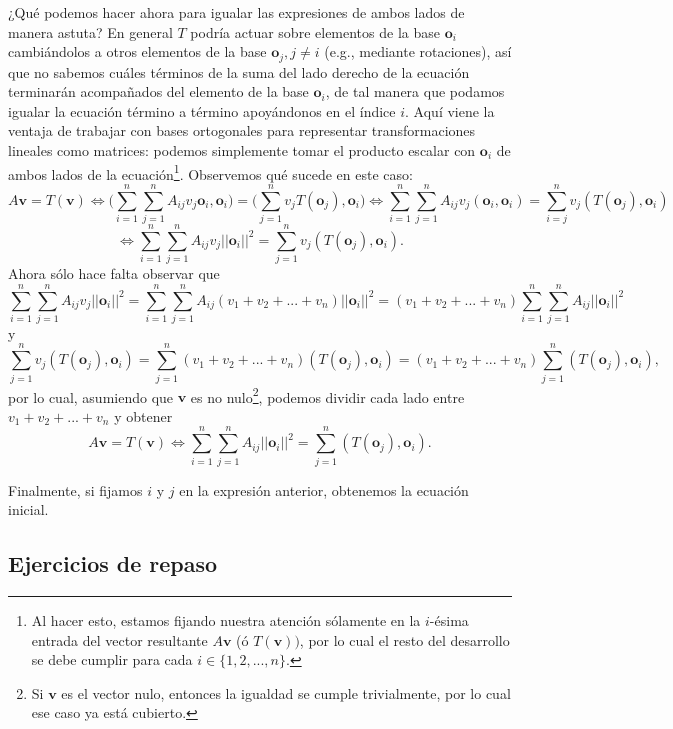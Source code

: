 \documentclass[12pt]{article}
\begin{document}
¿Qué podemos hacer ahora para igualar las expresiones de ambos lados de manera astuta? En general $T$ podría actuar sobre elementos de la base $\mathbf{o}_i$ cambiándolos a otros elementos de la base $\mathbf{o}_j, j\neq i$ (e.g., mediante rotaciones), así que no sabemos cuáles términos de la suma del lado derecho de la ecuación terminarán acompañados del elemento de la base $\mathbf{o}_i$, de tal manera que podamos igualar la ecuación término a término apoyándonos en el índice $i$. Aquí viene la ventaja de trabajar con bases ortogonales para representar transformaciones lineales como matrices: podemos simplemente tomar el producto escalar con $\mathbf{o}_i$ de ambos lados de la ecuación\footnote{Al hacer esto, estamos fijando nuestra atención sólamente en la $i$-ésima entrada del vector resultante $A\mathbf{v}$ (ó $T(\mathbf{v}))$, por lo cual el resto del desarrollo se debe cumplir para cada $i\in \{1,2,...,n\}$.}. Observemos qué sucede en este caso: \[
    A\mathbf{v}=T(\mathbf{v}) \iff \big (\sum_{i=1}^n \sum_{j=1}^n A_{ij} v_j \mathbf{o}_i, \mathbf{o}_i \big ) = \big ( \sum_{j=1}^n v_j T(\mathbf{o}_j), \mathbf{o}_i ) \iff \sum_{i=1}^n \sum_{j=1}^n A_{ij} v_j (\mathbf{o}_i,\mathbf{o}_i) = \sum_{i=j}^n v_j (T(\mathbf{o}_j),\mathbf{o}_i)
\] \[
\iff \sum_{i=1}^n \sum_{j=1}^n A_{ij} v_j ||\mathbf{o}_i||^2 = \sum_{j=1}^n v_j(T(\mathbf{o}_j),\mathbf{o}_i)
.\] \noindent Ahora sólo hace falta observar que \[
\sum_{i=1}^n \sum_{j=1}^n A_{ij} v_j ||\mathbf{o}_i||^2 = \sum_{i=1}^n \sum_{j=1}^n A_{ij} (v_1+v_2+...+v_n) ||\mathbf{o}_i||^2 = (v_1+v_2+...+v_n)\sum_{i=1}^n\sum_{j=1}^n A_{ij} ||\mathbf{o}_i||^2
\] \noindent y \[
\sum_{j=1}^n v_j (T(\mathbf{o}_j),\mathbf{o}_i) = \sum_{j=1}^n (v_1+v_2+...+v_n) (T(\mathbf{o}_j),\mathbf{o}_i) = (v_1+v_2+...+v_n) \sum_{j=1}^n (T(\mathbf{o}_j), \mathbf{o}_i)
,\] por lo cual, asumiendo que $\mathbf{v}$ es no nulo\footnote{Si $\mathbf{v}$ es el vector nulo, entonces la igualdad se cumple trivialmente, por lo cual ese caso ya está cubierto.}, podemos dividir cada lado entre $v_1+v_2+...+v_n$ y obtener \[
A\mathbf{v}=T(\mathbf{v}) \iff \sum_{i=1}^n \sum_{j=1}^n A_{ij} ||\mathbf{o}_i||^2 = \sum_{j=1}^n (T(\mathbf{o}_j),\mathbf{o}_i)
.\] 

Finalmente, si fijamos $i$ y $j$ en la expresión anterior, obtenemos la ecuación inicial.

\subsection{Ejercicios de repaso}
\end{document}
